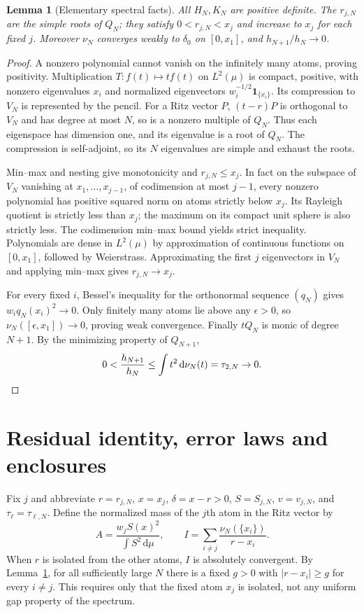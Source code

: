 \documentclass[11pt]{article}
\newtheorem{lemma}[theorem]{Lemma}
\theoremstyle{remark}\newtheorem{remark}[theorem]{Remark}
\newcommand{\dd}{\,\mathrm d}
\begin{document}
\begin{lemma}[Elementary spectral facts]\label{lem:spectral}
All $H_N,K_N$ are positive definite. The $r_{j,N}$ are the simple roots of $Q_N$; they satisfy $0<r_{j,N}<x_j$ and increase to $x_j$ for each fixed $j$. Moreover $\nu_N$ converges weakly to $\delta_0$ on $[0,x_1]$, and $h_{N+1}/h_N\to0$.
\end{lemma}
\begin{proof}
A nonzero polynomial cannot vanish on the infinitely many atoms, proving positivity. Multiplication $T:f(t)\mapsto tf(t)$ on $L^2(\mu)$ is compact, positive, with nonzero eigenvalues $x_i$ and normalized eigenvectors $w_i^{-1/2}\mathbf1_{\{x_i\}}$. Its compression to $V_N$ is represented by the pencil. For a Ritz vector $P$, $(t-r)P$ is orthogonal to $V_N$ and has degree at most $N$, so is a nonzero multiple of $Q_N$. Thus each eigenspace has dimension one, and its eigenvalue is a root of $Q_N$. The compression is self-adjoint, so its $N$ eigenvalues are simple and exhaust the roots.

Min--max and nesting give monotonicity and $r_{j,N}\le x_j$. In fact on the subspace of $V_N$ vanishing at $x_1,\ldots,x_{j-1}$, of codimension at most $j-1$, every nonzero polynomial has positive squared norm on atoms strictly below $x_j$. Its Rayleigh quotient is strictly less than $x_j$; the maximum on its compact unit sphere is also strictly less. The codimension min--max bound yields strict inequality. Polynomials are dense in $L^2(\mu)$ by approximation of continuous functions on $[0,x_1]$, followed by Weierstrass. Approximating the first $j$ eigenvectors in $V_N$ and applying min--max gives $r_{j,N}\to x_j$.

For every fixed $i$, Bessel's inequality for the orthonormal sequence $(q_N)$ gives $w_i q_N(x_i)^2\to0$. Only finitely many atoms lie above any $\epsilon>0$, so $\nu_N([\epsilon,x_1])\to0$, proving weak convergence. Finally $tQ_N$ is monic of degree $N+1$. By the minimizing property of $Q_{N+1}$,
\[
 0<\frac{h_{N+1}}{h_N}\le \int t^2\dd\nu_N(t)=\tau_{2,N}\to0.\qedhere
\]
\end{proof}

\section{Residual identity, error laws and enclosures}
Fix $j$ and abbreviate $r=r_{j,N}$, $x=x_j$, $\delta=x-r>0$, $S=S_{j,N}$, $v=v_{j,N}$, and $\tau_\ell=\tau_{\ell,N}$. Define the normalized mass of the $j$th atom in the Ritz vector by
\[
 A=\frac{w_jS(x)^2}{\int S^2\dd\mu},\qquad
 I=\sum_{i\ne j}\frac{\nu_N(\{x_i\})}{r-x_i}.
\]
When $r$ is isolated from the other atoms, $I$ is absolutely convergent. By Lemma~\ref{lem:spectral}, for all sufficiently large $N$ there is a fixed $g>0$ with $|r-x_i|\ge g$ for every $i\ne j$. This requires only that the fixed atom $x_j$ is isolated, not any uniform gap property of the spectrum.
\end{document}
